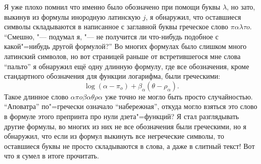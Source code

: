 Я уже плохо помнил что именно было обозначено при помощи буквы $\lambda$, но
зато, выкинув из формулы инородную латинскую $j$, я обнаружил, что оставшиеся
символы складываются в написанное с заглавной буквы греческое слово
$\pi\alpha\lambda\tau o$.
\enquote{Смешно, "--- подумал я, "--- не получится ли что-нибудь подобное с
какой"=нибудь другой формулой?}
Во многих формулах было слишком много латинский символов, но вот страницей
раньше от встретившегося мне слова \enquote{пальто} я обнаружил ещё одну длинную
формулу, где все обозначения, кроме стандартного обозначения для функции
логарифма, были греческими:
\begin{equation*}
\log(\alpha - \pi_o) + \beta_\alpha(\theta - \rho_\alpha).
\end{equation*}
Такое длинное слово $\alpha\pi o\beta\alpha\theta\rho\alpha$ уже точно не могло
быть просто случайностью.
\enquote{Аповатра} по"=гречески означало \enquote{набережная}, откуда могло
взяться это слово в формуле этого препринта про нули дзета"=функций?
Я стал разглядывать другие формулы, во многих из них не все обозначения были
греческими, но я обнаружил, что если из формул выкинуть все негреческие символы,
то оставшиеся буквы не просто складываются в слова, а даже в слитный текст!
Вот что я сумел в итоге прочитать.
